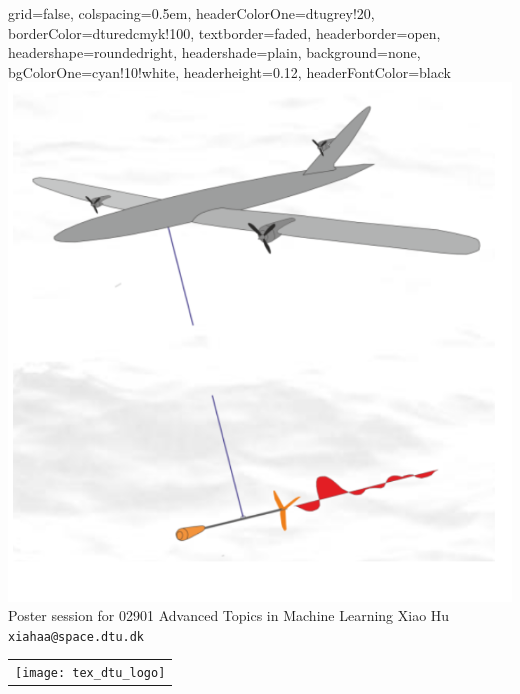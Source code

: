 \documentclass[landscape,a0paper,fontscale=0.292]{baposter}
\begin{document}
\begin{poster}{
 grid=false,
 colspacing=0.5em,
 headerColorOne=dtugrey!20,
 borderColor=dturedcmyk!100,%
 textborder=faded,
 headerborder=open,
 headershape=roundedright,
 headershade=plain,
 background=none,
 bgColorOne=cyan!10!white,
 headerheight=0.12\textheight,
 headerFontColor=black}
 {
      \includegraphics[width=0.1\linewidth]{figures/poster/pjd.png}
 }
 {\sc\Huge Poster session for 02901 Advanced Topics in Machine Learning}
 {Xiao Hu\\[0.5em]
 {\texttt{xiahaa@space.dtu.dk}}}
 {
  \begin{tabular}{r}
    \texttt{[image: tex\_dtu\_logo]}
  \end{tabular}
 }



\end{poster}
\end{document}
